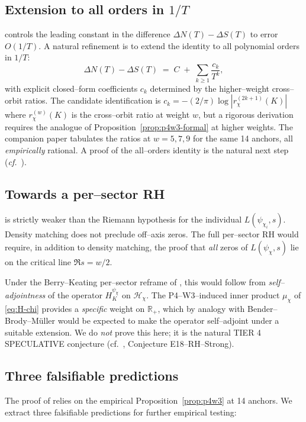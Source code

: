 \documentclass[11pt]{amsart}
\theoremstyle{definition}
\theoremstyle{remark}
\newcommand{\R}{\mathbb{R}}
\begin{document}
\subsection{Extension to all orders in \(1/T\)}\label{ssec:all-orders}
 controls the leading constant in the difference
\(\Delta N(T) - \Delta S(T)\) to error \(O(1/T)\). A natural refinement
is to extend the identity to all polynomial orders in \(1/T\):
\begin{equation}\label{eq:all-orders}
   \Delta N(T) - \Delta S(T)
   \;=\;
   C \;+\;
   \sum_{k \ge 1} \frac{c_k}{T^k} ,
\end{equation}
with explicit closed--form coefficients \(c_k\) determined by the
higher--weight cross--orbit ratios. The candidate identification is
\(c_k = -(2/\pi) \log|r_\chi^{(2k+1)}(K)|\) where \(r_\chi^{(w)}(K)\)
is the cross--orbit ratio at weight \(w\), but a rigorous derivation
requires the analogue of Proposition~\ref{prop:p4w3-formal} at higher
weights. The companion paper \cite{Remondiere2026bsd} tabulates the
ratios at \(w = 5, 7, 9\) for the same 14 anchors, all
\emph{empirically} rational. A proof of the all--orders identity is
the natural next step (\emph{cf.}\ \cite{Remondiere2026rh}).

\subsection{Towards a per--sector RH}\label{ssec:rh-per-sector}
 is strictly weaker than the Riemann hypothesis for the
individual \(L(\psi_{\chi_i}, s)\). Density matching does not preclude
off--axis zeros. The full per--sector RH would require, in addition to
density matching, the proof that \emph{all} zeros of
\(L(\psi_\chi, s)\) lie on the critical line \(\Re s = w/2\).

Under the Berry--Keating per--sector reframe of ,
this would follow from \emph{self--adjointness} of the operator
\(H_K^{\psi_\chi}\) on \(\mathcal H_\chi\). The
P4--W3--induced inner product \(\mu_\chi\) of \eqref{eq:H-chi} provides a
\emph{specific} weight on \(\R_+\), which by analogy with
Bender--Brody--M\"uller \cite{BBM2017} would be expected to make the
operator self--adjoint under a suitable
extension. We do \emph{not} prove this here; it is the natural
TIER 4 SPECULATIVE conjecture (cf.\ \cite{Remondiere2026rh}, Conjecture
E18--RH--Strong).

\subsection{Three falsifiable predictions}\label{ssec:falsif}
The proof of  relies on the empirical
Proposition~\ref{prop:p4w3} at 14 anchors. We extract three
falsifiable predictions for further empirical testing:
\end{document}
